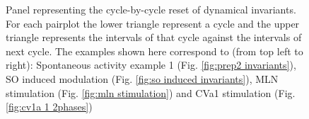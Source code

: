 \begin{figure}[htbp]
	\caption{Panel representing the  cycle-by-cycle reset of dynamical invariants. For each pairplot the lower triangle represent a cycle and the upper triangle represents the intervals of that cycle against the intervals of next cycle. The examples shown here correspond to (from top left to right): Spontaneous activity example 1 (Fig. \ref{fig:prep2 invariants}), SO induced modulation (Fig. \ref{fig:so induced invariants}), MLN stimulation (Fig. \ref{fig:mln stimulation}) and CVa1 stimulation (Fig. \ref{fig:cv1a 1 2phases})}
	\label{fig:reset pairplot comparison}
\end{figure}

\clearpage
\newpage
